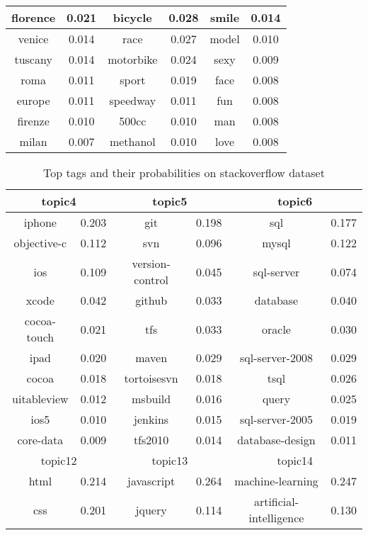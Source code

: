\begin{table}[htp]
\begin{tabular}{|c|c|c|c|c|c|}
florence&0.021&bicycle&0.028&smile&0.014\\ \hline
venice&0.014&race&0.027&model&0.010\\ \hline
tuscany&0.014&motorbike&0.024&sexy&0.009\\ \hline
roma&0.011&sport&0.019&face&0.008\\ \hline
europe&0.011&speedway&0.011&fun&0.008\\ \hline
firenze&0.010&500cc&0.010&man&0.008\\ \hline
milan&0.007&methanol&0.010&love&0.008\\ \hline
\end{tabular}
\end{table}



\begin{table}[htp]
\caption{Top tags and their probabilities on stackoverflow dataset}
\label{tab:stacktags}
\centering
\begin{tabular}{|c|c|c|c|c|c|}
\hline
\multicolumn{2}{|c|}{topic4} & \multicolumn{2}{c|}{topic5} & \multicolumn{2}{c|}{topic6}  \\
\hline
iphone&0.203&git&0.198&sql&0.177\\
\hline
objective-c&0.112&svn&0.096&mysql&0.122\\
\hline
ios&0.109&version-control&0.045&sql-server&0.074\\
\hline
xcode&0.042&github&0.033&database&0.040\\
\hline
cocoa-touch&0.021&tfs&0.033&oracle&0.030\\
\hline
ipad&0.020&maven&0.029&sql-server-2008&0.029\\
\hline
cocoa&0.018&tortoisesvn&0.018&tsql&0.026\\
\hline
uitableview&0.012&msbuild&0.016&query&0.025\\
\hline
ios5&0.010&jenkins&0.015&sql-server-2005&0.019\\
\hline
core-data&0.009&tfs2010&0.014&database-design&0.011\\
\hline
\hline
\multicolumn{2}{|c|}{topic12} & \multicolumn{2}{c|}{topic13} & \multicolumn{2}{c|}{topic14}   \\
\hline
html&0.214&javascript&0.264&machine-learning&0.247\\
\hline
css&0.201&jquery&0.114&artificial-intelligence&0.130\\

\end{tabular}
\end{table}
